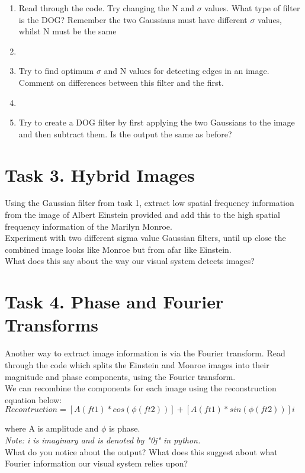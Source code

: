 \documentclass[12pt,english]{scrartcl}
\begin{document}
\begin{enumerate}
 \color{black}
 \item  Read through the code. Try changing the N and $\sigma$ values. What type of filter is the DOG? Remember the two Gaussians must have different $\sigma$ values, whilst N must be the same\\ 
 \item[]
 \color{black}
 \item Try to find optimum $\sigma$ and N values for detecting edges in an image. Comment on differences between this filter and the first.\\
 \item[]
 \color{black}
 \item Try to create a DOG filter by first applying the two Gaussians to the image and then subtract them. Is the output the same as before? \\
\end{enumerate}

\section*{Task 3. Hybrid Images}
Using the Gaussian filter from task 1, extract low spatial frequency information from the image of Albert Einstein provided and add this to the high spatial frequency information of the Marilyn Monroe. \\
\bigskip
Experiment with two different sigma value Gaussian filters, until up close the combined image looks like Monroe but from afar like Einstein. \\
\bigskip
What does this say about the way our visual system detects images?

\section*{Task 4. Phase and Fourier Transforms}
Another way to extract image information is via the Fourier transform. Read through the code which splits the Einstein and Monroe images into their magnitude and phase components, using the Fourier transform.  \\
\bigskip
We can recombine the components for each image using the reconstruction equation below: \\
\bigskip
\centering
$Recontruction = [A(ft1)*cos(\phi(ft2))] + [A(ft1)*sin(\phi(ft2))] i$ \\
\raggedright
where A is amplitude and $\phi$ is phase.\\
\bigskip
{\it Note: i is imaginary and is denoted by "0j" in python.} \\
\bigskip
What do you notice about the output? What does this suggest about what Fourier information our visual system relies upon?
\end{document}
